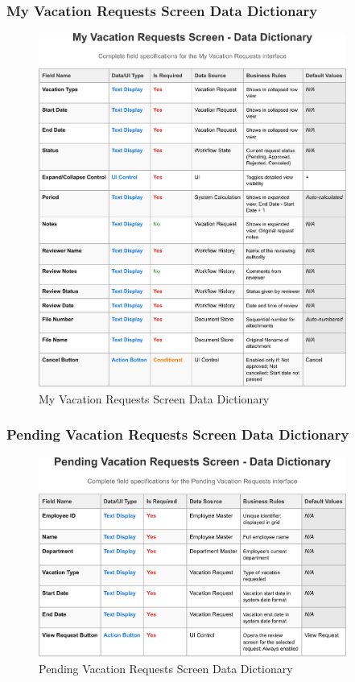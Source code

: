 \documentclass[12pt,a4paper]{article}
\begin{document}
\subsubsection{My Vacation Requests Screen Data Dictionary}
\begin{figure}[H]
\centering
\includegraphics[width=0.9\textwidth]{Data-Dictionary/Screen-Data-Dictionaries/My-Vacation-Requests-Screen-Data-Dictionary/My-Vacation-Requests-Screen-Data-Dictionary-1.png}
\caption{My Vacation Requests Screen Data Dictionary}
\label{fig:my-vacation-requests-data-dict}
\end{figure}

\subsubsection{Pending Vacation Requests Screen Data Dictionary}
\begin{figure}[H]
\centering
\includegraphics[width=0.9\textwidth]{Data-Dictionary/Screen-Data-Dictionaries/Pending-Vacation-Requests-Screen-Data-Dictionary/Pending-Vacation-Requests-Screen-Data-Dictionary-1.png}
\caption{Pending Vacation Requests Screen Data Dictionary}
\label{fig:pending-vacation-requests-data-dict}
\end{figure}
\end{document}
